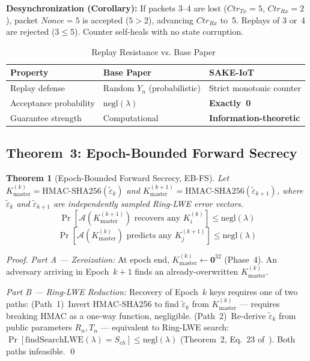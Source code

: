 \documentclass[conference]{IEEEtran}
\newtheorem{theorem}{Theorem}
\newcommand{\Kmaster}{K_{\mathrm{master}}}
\begin{document}
\noindent\textbf{Desynchronization (Corollary):} If packets 3--4 are lost
($\mathit{Ctr}_{Tx}=5$, $\mathit{Ctr}_{Rx}=2$), packet $\mathit{Nonce}=5$
is accepted ($5 > 2$), advancing $\mathit{Ctr}_{Rx}$ to~5. Replays of
3 or~4 are rejected ($3 \leq 5$). Counter self-heals with no state corruption.

\begin{table}[!t]
\centering
\caption{Replay Resistance vs. Base Paper~\cite{kumari2022}}
\label{tab:replaycompare}
\renewcommand{\arraystretch}{1.2}
\begin{tabular}{lll}
\toprule
\textbf{Property} & \textbf{Base Paper} & \textbf{SAKE-IoT} \\
\midrule
Replay defense & Random $Y_n$ (probabilistic) & Strict monotonic counter \\
Acceptance probability & $\mathrm{negl}(\lambda)$ & \textbf{Exactly~0} \\
Guarantee strength & Computational & \textbf{Information-theoretic} \\
\bottomrule
\end{tabular}
\end{table}

\subsection{Theorem~3: Epoch-Bounded Forward Secrecy}

\begin{theorem}[Epoch-Bounded Forward Secrecy, EB-FS]
\label{thm:ebfs}
Let $\Kmaster^{(k)} = \mathrm{HMAC\text{-}SHA256}(\tilde{\varepsilon}_k)$
and $\Kmaster^{(k+1)} = \mathrm{HMAC\text{-}SHA256}(\tilde{\varepsilon}_{k+1})$,
where $\tilde{\varepsilon}_k$ and $\tilde{\varepsilon}_{k+1}$ are independently
sampled Ring-LWE error vectors.
\begin{equation}
\Pr[\mathcal{A}(\Kmaster^{(k+1)}) \text{ recovers any } K_i^{(k)}] \leq \mathrm{negl}(\lambda)
\end{equation}
\begin{equation}
\Pr[\mathcal{A}(\Kmaster^{(k)}) \text{ predicts any } K_j^{(k+1)}] \leq \mathrm{negl}(\lambda)
\end{equation}
\end{theorem}

\begin{proof}
\textit{Part A --- Zeroization:} At epoch end,
$\Kmaster^{(k)} \leftarrow \mathbf{0}^{32}$ (Phase~4). An adversary
arriving in Epoch~$k{+}1$ finds an already-overwritten $\Kmaster^{(k)}$.

\textit{Part B --- Ring-LWE Reduction:} Recovery of Epoch~$k$ keys
requires one of two paths: (Path~1)~Invert HMAC-SHA256 to find
$\tilde{\varepsilon}_k$ from $\Kmaster^{(k)}$ --- requires breaking
HMAC as a one-way function, negligible. (Path~2)~Re-derive
$\tilde{\varepsilon}_k$ from public parameters $R_n, T_n$ ---
equivalent to Ring-LWE search:
$\Pr[\mathrm{findSearchLWE}(\lambda) = S_{ch}] \leq \mathrm{negl}(\lambda)$
(Theorem~2, Eq.~23 of~\cite{kumari2022}). Both paths infeasible. \qed
\end{proof}
\end{document}
